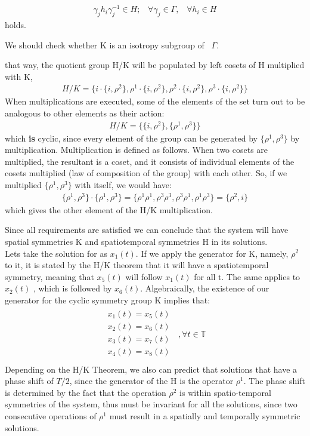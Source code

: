 \begin{align}
\gamma _j h_i \gamma _j^{-1} \in H ; \;\;\; \forall \gamma _j \in \Gamma  ,\;\;\; \forall h_i \in H
\end{align}
holds. 

We should check whether K is an isotropy subgroup of \ $\Gamma $.

that way, the quotient group H/K will be populated by left cosets of H multiplied with K,
%
\begin{align}
H/K =\{ i\cdot \{i,\rho^2\},\rho^1 \cdot \{i,\rho^2\},\rho^2 \cdot \{i,\rho^2\}, \rho^3 \cdot\{i,\rho^2\}  \}
\end{align}
%
When multiplications are executed, some of the elements of the set turn out to be analogous to other elements as their action:
%
\begin{align}
H/K =\{ \{i,\rho^2\},\{\rho^1,\rho^3\} \}
\end{align}
%
which \textbf{is} cyclic, since every element of the group can be generated by $\{\rho^1,\rho^3\}$ by multiplication. Multiplication is defined as follows. When two cosets are multiplied, the resultant is a coset, and it consists of individual elements of the cosets multiplied (law of composition of the group) with each other. So, if we multiplied $\{\rho^1,\rho^3\}$ with itself, we would have:
\begin{align}
\{\rho^1,\rho^3\}\cdot \{\rho^1,\rho^3\} = \{\rho^1\rho^1,\rho^3\rho^3,\rho^3\rho^1,\rho^1\rho^3\}=\{\rho^2,i\}
\end{align}
which gives the other element of the H/K multiplication.

 Since all requirements are satisfied we can conclude that the system will have spatial symmetries K and spatiotemporal symmetries H in its solutions.\\

Lets take the solution for  as $x_1(t)$. If we apply the generator for K, namely, $\rho^2$ to it, it is stated by the H/K theorem that it will have a spatiotemporal symmetry, meaning that $x_5(t)$ will follow $x_1(t)$ for all t. The same applies to $x_2(t)$ , which is followed by $x_6(t)$. Algebraically, the existence of our generator for the cyclic symmetry group K  implies that:
%
\begin{align}
\begin{array}{c}
x_1(t)  = x_5 (t)\\
x_2(t)  = x_6 (t)\\
x_3(t)  = x_7 (t)\\
x_4(t)  = x_8 (t)\\
\end{array}  \;\; ,  \forall t \in \mathbb{T}
\end{align} 
%
Depending on the H/K Theorem, we also can predict that solutions that have a phase shift of $T/2$, since the generator of the H is the operator $\rho^1$. The phase shift is determined by the fact that the operation $\rho^2$ is within spatio-temporal symmetries of the system, thus must be invariant for all the solutions, since two consecutive operations of $\rho^1$ must result in a spatially and temporally symmetric solutions.

